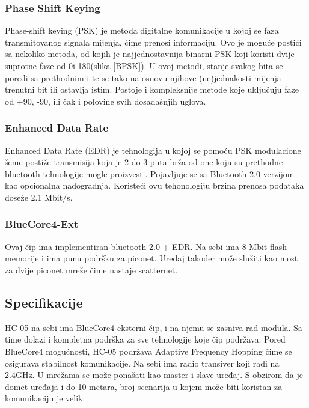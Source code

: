 \documentclass[../Document.tex]{subfiles}
\begin{document}
\subsubsection{Phase Shift Keying}
Phase-shift keying (PSK) je metoda digitalne komunikacije u kojoj se faza transmitovanog signala mijenja, čime prenosi informaciju. Ovo je moguće postići sa nekoliko metoda, od kojih je najjednostavnija binarni PSK koji koristi dvije suprotne faze od 0\textdegree i 180\textdegree (slika \ref{BPSK}). U ovoj metodi, stanje svakog bita se poredi sa prethodnim i te se tako na osnovu njihove (ne)jednakosti mijenja trenutni bit ili ostavlja istim. Postoje i kompleksnije metode koje uključuju faze od +90\textdegree, -90\textdegree, ili čak i polovine svih dosadašnjih uglova.

\subsubsection{Enhanced Data Rate}
Enhanced Data Rate (EDR) je tehnologija u kojoj se pomoću PSK modulacione šeme postiže transmisija koja je 2 do 3 puta brža od one koju su prethodne bluetooth tehnologije mogle proizvesti. Pojavljuje se sa Bluetooth 2.0 verzijom kao opcionalna nadogradnja. Koristeći ovu tehonologiju brzina prenosa podataka doseže 2.1 Mbit/s.

\subsubsection{BlueCore4-Ext}
Ovaj čip ima implementiran bluetooth 2.0 + EDR. Na sebi ima 8 Mbit flash memorije i ima punu podršku za piconet. Uređaj također može služiti kao most za dvije piconet mreže čime nastaje scatternet.


\subsection{Specifikacije}
HC-05 na sebi ima BlueCore4 eksterni čip, i na njemu se zasniva rad modula. Sa time dolazi i kompletna podrška za sve tehnologije koje čip podržava. Pored BlueCore4 mogućnosti, HC-05 podržava Adaptive Frequency Hopping čime se osigurava stabilnost komunikacije. Na sebi ima radio transiver koji radi na 2.4GHz. U mrežama se može ponašati kao master i slave uređaj. S obzirom da je domet uređaja i do 10 metara, broj scenarija u kojem može biti koristan za komunikaciju je velik.
\end{document}
